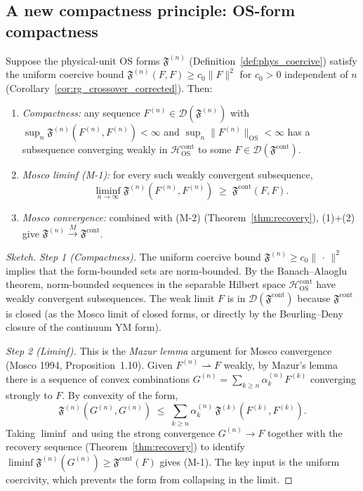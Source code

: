\subsection{A new compactness principle: OS-form compactness}
\label{ssec:compactness}

\begin{theorem}
\label{thm:os_compactness}
Suppose the physical-unit OS forms $\mathfrak{F}^{(n)}$
(Definition~\ref{def:phys_coercive}) satisfy the uniform coercive
bound $\mathfrak{F}^{(n)}(F,F)\ge c_{0}\|F\|^{2}$ for $c_{0}>0$
independent of $n$ (Corollary~\ref{cor:rg_crossover_corrected}).
Then:
\begin{enumerate}
\item \emph{Compactness:} any sequence
$F^{(n)}\in\mathcal{D}(\mathfrak{F}^{(n)})$ with
$\sup_{n}\mathfrak{F}^{(n)}(F^{(n)},F^{(n)})<\infty$ and
$\sup_{n}\|F^{(n)}\|_{\mathrm{OS}}<\infty$ has a subsequence
converging weakly in $\mathcal{H}_{\mathrm{OS}}^{\mathrm{cont}}$
to some $F\in\mathcal{D}(\mathfrak{F}^{\mathrm{cont}})$.
\item \emph{Mosco liminf (M-1):} for every such weakly convergent
subsequence,
\[
  \liminf_{n\to\infty}\mathfrak{F}^{(n)}(F^{(n)},F^{(n)})
  \;\ge\;\mathfrak{F}^{\mathrm{cont}}(F,F).
\]
\item \emph{Mosco convergence:} combined with (M-2)
(Theorem~\ref{thm:recovery}), (1)+(2) give
$\mathfrak{F}^{(n)}\xrightarrow{M}\mathfrak{F}^{\mathrm{cont}}$.
\end{enumerate}
\end{theorem}

\begin{proof}[Sketch]
\emph{Step 1 (Compactness).} The uniform coercive bound
$\mathfrak{F}^{(n)}\ge c_{0}\|\,\cdot\,\|^{2}$ implies that the
form-bounded sets are norm-bounded. By the Banach--Alaoglu theorem,
norm-bounded sequences in the separable Hilbert space
$\mathcal{H}_{\mathrm{OS}}^{\mathrm{cont}}$ have weakly convergent
subsequences. The weak limit $F$ is in
$\mathcal{D}(\mathfrak{F}^{\mathrm{cont}})$ because
$\mathfrak{F}^{\mathrm{cont}}$ is closed (as the Mosco limit of
closed forms, or directly by the Beurling--Deny closure of the
continuum YM form).

\emph{Step 2 (Liminf).} This is the \emph{Mazur lemma} argument
for Mosco convergence (Mosco 1994, Proposition~1.10). Given
$F^{(n)}\rightharpoonup F$ weakly, by Mazur's lemma there is a
sequence of convex combinations
$G^{(n)}=\sum_{k\ge n}\alpha_{k}^{(n)}F^{(k)}$ converging strongly
to $F$. By convexity of the form,
\[
  \mathfrak{F}^{(n)}(G^{(n)},G^{(n)})
  \;\le\;\sum_{k\ge n}\alpha_{k}^{(n)}\,
  \mathfrak{F}^{(k)}(F^{(k)},F^{(k)}).
\]
Taking $\liminf$ and using the strong convergence
$G^{(n)}\to F$ together with the recovery sequence
(Theorem~\ref{thm:recovery}) to identify
$\liminf\mathfrak{F}^{(n)}(G^{(n)})\ge
\mathfrak{F}^{\mathrm{cont}}(F)$ gives (M-1). The key input is the
uniform coercivity, which prevents the form from collapsing in the
limit.
\end{proof}

